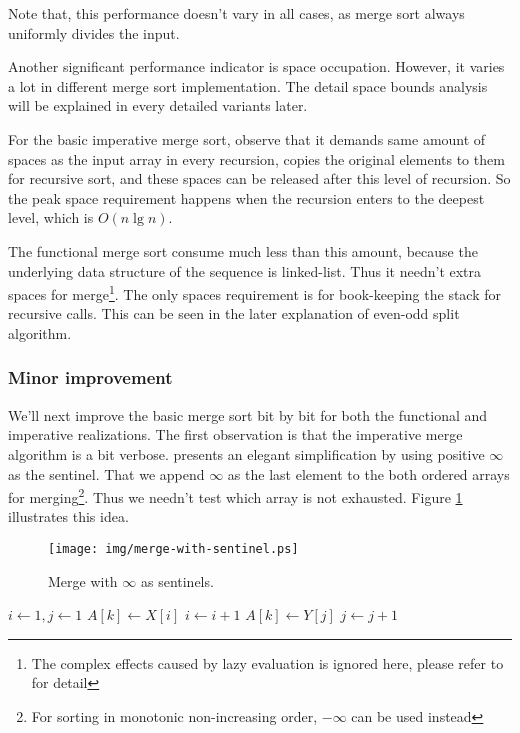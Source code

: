 \documentclass[UTF8]{article}
\begin{document}
Note that, this performance doesn't vary in all cases, as merge sort always uniformly divides the input.

Another significant performance indicator is space occupation. However, it varies a lot in different
merge sort implementation. The detail space bounds analysis will be explained in every detailed variants
later.

For the basic imperative merge sort, observe that it demands same amount of spaces as the input array
in every recursion, copies the original elements to them for recursive sort, and these spaces can
be released after this level of recursion. So the peak space requirement happens when the recursion
enters to the deepest level, which is $O(n \lg n)$.

The functional merge sort consume much less than this amount, because the underlying data structure
of the sequence is linked-list. Thus it needn't extra spaces for merge\footnote{The complex effects
caused by lazy evaluation is ignored here, please refer to \cite{algo-fp} for detail}.
The only spaces requirement is for book-keeping the stack for recursive calls. This can be
seen in the later explanation of even-odd split algorithm.

\subsubsection{Minor improvement}
We'll next improve the basic merge sort bit by bit for both the functional and imperative realizations.
The first observation is that the imperative merge algorithm is a bit verbose. \cite{CLRS} presents
an elegant simplification by using positive $\infty$ as the sentinel. That we append $\infty$ as
the last element to the both ordered arrays for merging\footnote{For sorting in monotonic non-increasing order,
$-\infty$ can be used instead}. Thus we needn't test which array is not exhausted. Figure \ref{fig:merge-with-sentinel}
illustrates this idea.

\begin{figure}[htbp]
 \centering
 \texttt{[image: img/merge-with-sentinel.ps]}
 \caption{Merge with $\infty$ as sentinels.}
 \label{fig:merge-with-sentinel}
\end{figure}

\begin{algorithmic}[1]
  \State {}
  \State {}
  \State $i \gets 1, j\gets 1$
      \State $A[k] \gets X[i]$
      \State $i \gets i + 1$
    \Else
      \State $A[k] \gets Y[j]$
      \State $j \gets j + 1$
    \EndIf
  \EndFor
\EndProcedure
\end{algorithmic}
\end{document}
